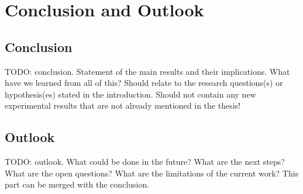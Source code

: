 \chapter{Conclusion and Outlook}\label{chap:conclusion}

\section{Conclusion}

TODO: conclusion. Statement of the main results and their implications. What have we learned from all of this? Should relate to the research questions(s) or hypothesis(es) stated in the introduction. Should not contain any new experimental results that are not already mentioned in the thesis!

\section{Outlook}

TODO: outlook. What could be done in the future? What are the next steps? What are the open questions? What are the limitations of the current work? This part can be merged with the conclusion.